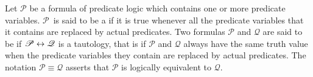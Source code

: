 \begin{definition}
Let $\mathscr{P}$ be a formula of predicate logic which contains one or more
predicate variables.  $\mathscr{P}$~is said to be a 
if it is true whenever all the predicate variables that it contains are replaced
by actual predicates.  Two formulas $\mathscr{P}$ and $\mathscr{Q}$ are
said to be  if $\mathscr{P}\leftrightarrow\mathscr{Q}$ is
a tautology, that is if $\mathscr{P}$ and $\mathscr{Q}$ always have the same
truth value when the predicate variables they contain are replaced by actual
predicates.  The notation $\mathscr{P}\equiv\mathscr{Q}$ asserts that
$\mathscr{P}$ is logically equivalent to $\mathscr{Q}$.
\end{definition}




